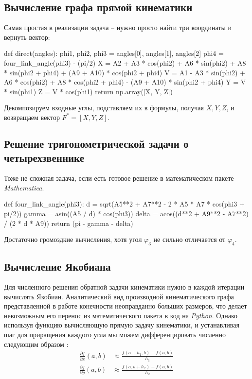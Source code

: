 \subsection{Вычисление графа прямой кинематики}

Самая простая в реализации задача -- нужно просто найти три координаты и вернуть вектор:
\begin{python}
def direct(angles):
    phi1, phi2, phi3 = angles[0], angles[1], angles[2]
    phi4 = four_link_angle(phi3) - (pi/2)
    X = A2 + A3 * cos(phi2) + A6 * sin(phi2) + A8 * sin(phi2 + phi4) + (A9 + A10) * cos(phi2 + phi4)
    V = A1 - A3 * sin(phi2) + A6 * cos(phi2) + A8 * cos(phi2 + phi4) - (A9 + A10) * sin(phi2 + phi4)
    Y = V * sin(phi1)
    Z = V * cos(phi1)
    return np.array([X, Y, Z])
\end{python}

\noindent Декомпозируем входные углы, подставляем их в формулы, получая $ X, Y, Z $, и возвращаем вектор $ F^* =[ X, Y, Z ] $.

\subsection{Решение тригонометрической задачи о четырехзвеннике}
Тоже не сложная задача, если есть готовое решение в математическом пакете \textit{Mathematica}.
\begin{python}
def four_link_angle(phi3):
    d = sqrt(A5**2 + A7**2 - 2 * A5 * A7 * cos(phi3 + pi/2))
    gamma = asin((A5 / d) * cos(phi3))
    delta = acos((d**2 + A9**2 - A7**2) / (2 * d * A9))
    return (pi - gamma - delta)
\end{python}

\noindent Достаточно громоздкие вычисления, хотя угол $ \varphi_3 $ не сильно отличается от $ \varphi_4 $.

\subsection{Вычисление Якобиана}
Для численного решения обратной задачи кинематики нужно в каждой итерации вычислять Якобиан. Аналитический вид производной кинематического графа представленной в работе конечности неоправданно больших размеров, что делает невозможным его перенос из математического пакета в код на \textit{Python}. Однако используя функцию вычисляющую прямую задачу кинематики, и устанавливая шаг для приращения каждого угла мы можем дифференцировать численно следующим образом \cite{Morken2010}:
\begin{align*}
    \frac{\partial f}{\partial x}(a, b) &\approx \frac{f(a+h_1, b) - f(a, b)}{h_1} \\ 
    \frac{\partial f}{\partial y}(a, b) &\approx \frac{f(a, b+h_2) - f(a, b)}{h_2}
\end{align*}

